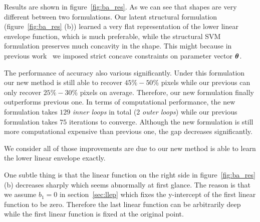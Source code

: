 Results are shown in figure~\ref{fig:ba_res}. As we can see
that shapes are very different between two formulations. Our
latent structural formulation (figure~\ref{fig:ba_res} (b))
learned a very flat representation of the lower linear envelope
function, which is much preferable, while the structural SVM
formulation preserves much concavity in the shape. This might
because in previous work~\cite{gouldlearning,Gould:ICML2011}
we imposed strict concave constraints on parameter vector
${\bm{\theta}}$.

The performance of accuracy also various significantly. Under
this formulation our new method is still able to recover
$45\%-50\%$ pixels while our previous can only recover
$25\%-30\%$ pixels on average. Therefore, our new formulation
finally outperforms previous one. In terms of computational
performance, the new formulation takes $129$ \emph{inner loops}
in total (2 \emph{outer loops}) while our previous formulation
takes $75$ iterations to converge. Although the new formulation
is still more computational expensive than previous one, the gap
decreases significantly.

We consider all of those improvements are due to our new method
is able to learn the lower linear envelope exactly.

One subtle thing is that the linear function on the right side in
figure~\ref{fig:ba_res} (b) decreases sharply which seems
abnormally at first glance. The reason is that we assume $b_1=0$
in section~\ref{sec:llep} which fixes the y-intercept of the
first linear function to be zero. Therefore the last linear
function can be arbitrarily deep while the first linear function
is fixed at the original point.

